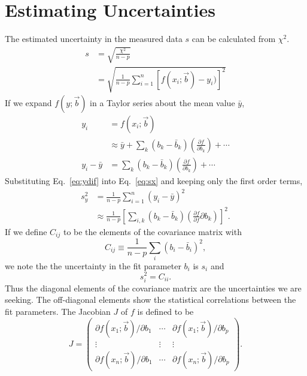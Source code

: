 \documentclass{scrartcl}
\begin{document}
\section{Estimating Uncertainties}
The estimated uncertainty in the measured data $s$ can be calculated
from $\chi^2$.
\begin{align}
s &= \sqrt{\frac{\chi^2}{n-p}}\\
&= \sqrt{\frac{1}{n-p}\sum_{i=1}^n [f(x_i;\vec{b})-y_i)]^2}\label{eq:sx}
\end{align}
If we expand $f(y;\vec{b})$ in a Taylor series about
the mean value $\bar{y}$,
\begin{align}
y_i &= f(x_i;\vec{b})\\
 &\approx \bar{y}+\sum_k(b_k-\bar{b}_k)\left(
	\frac{\partial f}{\partial b_k}\right) +\cdots\\
y_i - \bar{y} &= \sum_k(b_k-\bar{b}_k)\left(
	\frac{\partial f}{\partial b_k}\right) +\cdots \label{eq:ydif}
\end{align}
Substituting Eq.~\ref{eq:ydif} into Eq.~\ref{eq:sx} and keeping
only the first order terms,
\begin{align}
s_y^2 &= \frac{1}{n-p}\sum_{i=1}^n(y_i-\bar{y})^2\\
	&\approx \frac{1}{n-p}\left[\sum_{i,k}(b_k-\bar{b}_k)\left(
		\frac{\partial f}{\partial f}{\partial b_k}\right)\right]^2.
		\label{eq:sy2}
\end{align}
If we define $C_{ij}$ to be the elements of the
covariance matrix with
\begin{equation}
C_{ij} \equiv \frac{1}{n-p}\sum_i(b_i-\bar{b}_i)^2,
\end{equation}
we note the the uncertainty in the fit parameter $b_i$ is $s_i$ and
\begin{equation}
s_i^2 = C_{ii}.
\end{equation}
Thus the diagonal elements of the covariance matrix are the uncertainties
we are seeking. The off-diagonal elements show the statistical
correlations between the fit parameters.
The Jacobian $J$ of $f$ is defined to be
\begin{equation}
J = \left(\begin{array}{ccc}
\partial f(x_1;\vec{b})/\partial b_1& \cdots &
	\partial f(x_1;\vec{b})/\partial b_p\\
\vdots & \vdots & \vdots \\
\partial f(x_n; \vec{b})/\partial b_1 & \cdots  &
	\partial f(x_n;\vec{b})/\partial b_p
\end{array}\right).
\end{equation}
\end{document}

